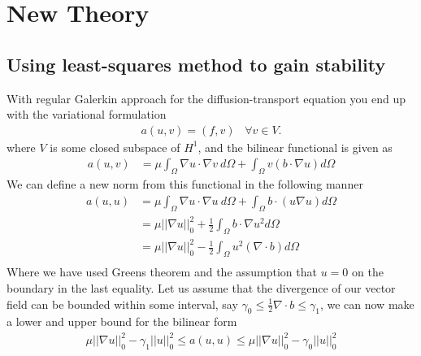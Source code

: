 
\chapter{New Theory} %

\label{chap:newTheory} %


\section{Using least-squares method to gain stability}

With regular Galerkin approach for the diffusion-transport equation you end up with the variational formulation 
\begin{align}
	a(u,v) = (f,v) \; \; \; \forall v \in V.
	\label{eq:varFormDiffFEM}
\end{align}
where $V$ is some closed subspace of $H^1$, and the bilinear functional is given as 
\begin{align}
	a(u,v) &= \mu\int_{\Omega}\nabla u \cdot \nabla v \: d\Omega 
	+ \int_{\Omega} v (b \cdot \nabla u) d \Omega
	\label{eq:bilinearFunctional}
\end{align}
We can define a new norm from this functional in the following manner
\begin{align}
	a(u,u) &= \mu\int_{\Omega}\nabla u \cdot \nabla u \: d\Omega 
	+ \int_{\Omega}  b \cdot (u\nabla u) d \Omega\\
	       &= \mu||\nabla u||^2_0 
	+ \frac{1}{2}\int_{\Omega} b \cdot \nabla u^2 d \Omega \\
	       &= \mu||\nabla u||^2_0 
	- \frac{1}{2}\int_{\Omega} u^2  (\nabla \cdot b)  d \Omega \\
	\label{eq:bilinearFunctional}
\end{align}
Where we have used Greens theorem and the assumption that $u=0$ on the boundary in the last equality. Let us assume that the divergence of our vector field can be bounded within some interval, say  $\gamma_0 \leq \frac{1}{2}\nabla \cdot b \leq \gamma_1 $, we can now make a lower and upper bound for the bilinear form 
\begin{align}
	\mu||\nabla u||^2_0 - \gamma_1||u||^2_0 \leq a(u,u) \leq \mu||\nabla u||^2_0 - \gamma_0||u||^2_0
	\label{eq:bilinearOperatorBounds}
\end{align}

